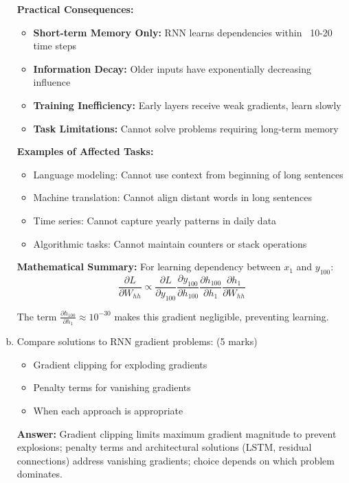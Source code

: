 \documentclass[12pt]{article}
\newcommand{\answer}[1]{{\color{answercolor}\textbf{Answer:} #1}}
\begin{document}
\begin{enumerate}[(a)]
{    \textbf{Practical Consequences:}
    \begin{itemize}
        \item \textbf{Short-term Memory Only:} RNN learns dependencies within ~10-20 time steps
        \item \textbf{Information Decay:} Older inputs have exponentially decreasing influence
        \item \textbf{Training Inefficiency:} Early layers receive weak gradients, learn slowly
        \item \textbf{Task Limitations:} Cannot solve problems requiring long-term memory
    \end{itemize}
    
    \textbf{Examples of Affected Tasks:}
    \begin{itemize}
        \item Language modeling: Cannot use context from beginning of long sentences
        \item Machine translation: Cannot align distant words in long sentences
        \item Time series: Cannot capture yearly patterns in daily data
        \item Algorithmic tasks: Cannot maintain counters or stack operations
    \end{itemize}
    
    \textbf{Mathematical Summary:}
    For learning dependency between $x_1$ and $y_{100}$:
    $$\frac{\partial L}{\partial W_{hh}} \propto \frac{\partial L}{\partial y_{100}} \frac{\partial y_{100}}{\partial h_{100}} \frac{\partial h_{100}}{\partial h_1} \frac{\partial h_1}{\partial W_{hh}}$$
    
    The term $\frac{\partial h_{100}}{\partial h_1} \approx 10^{-30}$ makes this gradient negligible, preventing learning.
    }
    
    \item Compare solutions to RNN gradient problems: \hfill (5 marks)
    \begin{itemize}
        \item Gradient clipping for exploding gradients
        \item Penalty terms for vanishing gradients
        \item When each approach is appropriate
    \end{itemize}
    
    \answer{Gradient clipping limits maximum gradient magnitude to prevent explosions; penalty terms and architectural solutions (LSTM, residual connections) address vanishing gradients; choice depends on which problem dominates.}
    

\end{enumerate}
\end{document}
